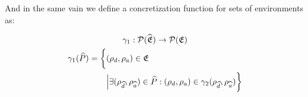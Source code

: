 And in the same vain we define a concretization function for sets of environments as:


\begin{gather}
    \gamma_1 : \mathcal{P}(\widehat{\mathfrak{E}}) \rightarrow \mathcal{P}(\mathfrak{E})\\
    \begin{split}
        \gamma_1(\widehat{P}) = \biggl\{ &(\rho_{d}, \rho_{a}) \in \mathfrak{E} \\
        &\Big| \exists (\rho_{\widehat{d}}, \rho_{\widehat{a}}) \in \widehat{P} : (\rho_{d}, \rho_{a}) \in \gamma_2(\rho_{\widehat{d}}, \rho_{\widehat{a}})\biggr\}
    \end{split}
\end{gather}

